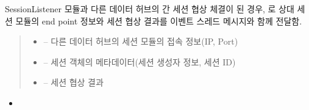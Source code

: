 \documentclass[a4paper,10pt,english]{sphinxmanual}
\begin{document}
\begin{fulllineitems}
\begin{fulllineitems}
\label{\detokenize{_SessionListener:SessionListener._smTransmitNegotiationResult}}
\pysigstartsignatures
{}
\pysigstopsignatures
\sphinxAtStartPar
SessionListener 모듈과 다른 데이터 허브의 {\hyperref[\detokenize{_SessionRequester:sessionrequester}]{}} 간 세션 협상 체결이 된 경우,
{\hyperref[\detokenize{_SessionManager:sessionmanager}]{}} 로 상대 세션 모듈의 end point 정보와 세션 협상 결과를  이벤트 스레드 메시지와 함께 전달함.
\begin{quote}\begin{description}
\begin{itemize}
\item {} 
\sphinxAtStartPar
{} – 다른 데이터 허브의 세션 모듈의 접속 정보(IP, Port)

\item {} 
\sphinxAtStartPar
{} – 세션 객체의 메타데이터(세션 생성자 정보, 세션 ID)

\item {} 
\sphinxAtStartPar
{} – 세션 협상 결과

\end{itemize}

\end{description}\end{quote}


\nopagebreak

\begin{itemize}
\item {} 
\sphinxAtStartPar
{\hyperref[\detokenize{_SessionManager:SessionManager._slListener}]{}}

\end{itemize}



\end{fulllineitems}


\end{fulllineitems}
\end{document}
